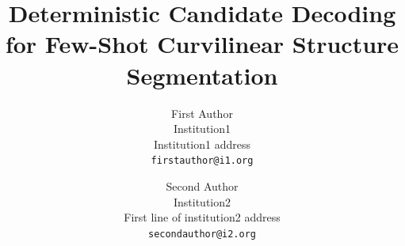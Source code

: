 \documentclass[10pt,twocolumn,letterpaper]{article}
\title{Deterministic Candidate Decoding for Few-Shot Curvilinear Structure Segmentation}
\author{First Author\\
Institution1\\
Institution1 address\\
{\tt\small firstauthor@i1.org}
\and
Second Author\\
Institution2\\
First line of institution2 address\\
{\tt\small secondauthor@i2.org}
}
\begin{document}
\maketitle
    











\clearpage
{
    \small
    
    
}

% 
\end{document}
